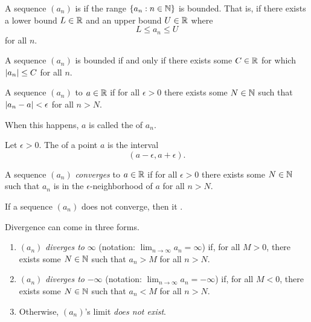 \documentclass[11pt,twoside=off,numbers=noenddot]{scrbook}
\begin{document}
\begin{definition}
  A sequence $(a_n)$ is  if the range $\{ a_n : n
  \in \mathbb N \}$ is bounded. That is, if there exists a lower bound $L \in
  \mathbb R$ and an upper bound $U \in \mathbb R$ where
  \[ L \leq a_n \leq U \]
  for all $n$.
\end{definition}

\begin{proposition}
  A sequence $(a_n)$ is bounded if and only if there exists some $C
  \in \mathbb R$ for which $| a_n | \leq C$ for all $n$.
\end{proposition}

\begin{definition}
  A sequence $(a_n)$  to $a \in \mathbb R$ if for all
  $\epsilon > 0$ there exists some $N \in \mathbb N$ such that $| a_n -
  a | < \epsilon$ for all $n > N$.

  When this happens, $a$ is called the  of $a_n$.
\end{definition}

\begin{definition}
  Let $\epsilon > 0$. The  of a point
  $a$ is the interval
  \[ (a - \epsilon, a + \epsilon). \]
\end{definition}

\begin{definition}
  A sequence $(a_n)$ \textit{converges} to $a \in \mathbb R$ if for all
  $\epsilon > 0$ there exists some $N \in \mathbb N$ such that $a_n$ is in
  the $\epsilon$-neighborhood of $a$ for all $n > N$.
\end{definition}

\begin{definition}
  If a sequence $(a_n)$ does not converge, then it .

  Divergence can come in three forms.
  \begin{enumerate}
    \item $(a_n)$ \textit{diverges to} $\infty$ (notation: $\lim_{n
      \to \infty} a_n = \infty$) if, for all $M > 0$, there exists
      some $N \in \mathbb N$ such that $a_n > M$ for all $n > N$.
    \item $(a_n)$ \textit{diverges to} $-\infty$ (notation: $\lim_{n
      \to \infty} a_n = -\infty$) if, for all $M < 0$, there exists
      some $N \in \mathbb N$ such that $a_n < M$ for all $n > N$.
    \item Otherwise, $(a_n)$'s limit \textit{does not exist}.
  \end{enumerate}
\end{definition}
\end{document}
